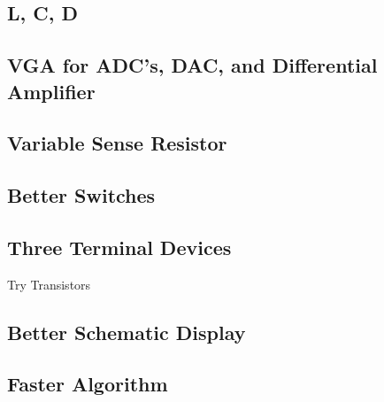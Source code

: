 \documentclass[11pt,twoside]{mitthesis}
\begin{document}
\subsection{L, C, D}
\subsection{VGA for ADC's, DAC, and Differential Amplifier}
\subsection{Variable Sense Resistor}
\subsection{Better Switches}
\subsection{Three Terminal Devices}
Try Transistors
\subsection{Better Schematic Display}
\subsection{Faster Algorithm}

\ifdefined\DEBUG
\end{document}
